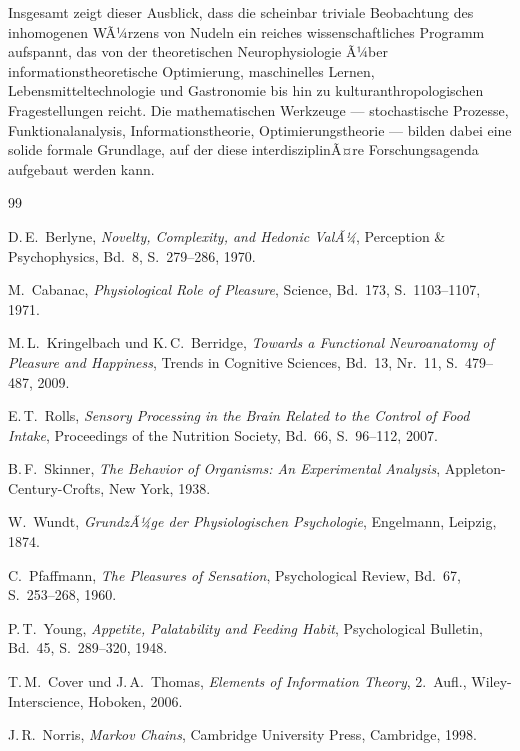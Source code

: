 ﻿\documentclass[12pt,a4paper]{article}
\theoremstyle{definition}
\begin{document}
\bigskip

Insgesamt zeigt dieser Ausblick, dass die scheinbar triviale
Beobachtung des inhomogenen WÃ¼rzens von Nudeln ein reiches
wissenschaftliches Programm aufspannt, das von der theoretischen
Neurophysiologie Ã¼ber informationstheoretische Optimierung, maschinelles
Lernen, Lebensmitteltechnologie und Gastronomie bis hin zu
kulturanthropologischen Fragestellungen reicht. Die mathematischen
Werkzeuge --- stochastische Prozesse, Funktionalanalysis,
Informationstheorie, Optimierungstheorie --- bilden dabei eine
solide formale Grundlage, auf der diese interdisziplinÃ¤re
Forschungsagenda aufgebaut werden kann.

\begin{thebibliography}{99}

D.\,E.\ Berlyne,
\textit{Novelty, Complexity, and Hedonic ValÃ¼},
Perception \& Psychophysics, Bd.\ 8, S.\ 279--286, 1970.

M.\ Cabanac,
\textit{Physiological Role of Pleasure},
Science, Bd.\ 173, S.\ 1103--1107, 1971.

M.\,L.\ Kringelbach und K.\,C.\ Berridge,
\textit{Towards a Functional Neuroanatomy of Pleasure and Happiness},
Trends in Cognitive Sciences, Bd.\ 13, Nr.\ 11, S.\ 479--487, 2009.

E.\,T.\ Rolls,
\textit{Sensory Processing in the Brain Related to the Control of Food Intake},
Proceedings of the Nutrition Society, Bd.\ 66, S.\ 96--112, 2007.

B.\,F.\ Skinner,
\textit{The Behavior of Organisms: An Experimental Analysis},
Appleton-Century-Crofts, New York, 1938.

W.\ Wundt,
\textit{GrundzÃ¼ge der Physiologischen Psychologie},
Engelmann, Leipzig, 1874.

C.\ Pfaffmann,
\textit{The Pleasures of Sensation},
Psychological Review, Bd.\ 67, S.\ 253--268, 1960.

P.\,T.\ Young,
\textit{Appetite, Palatability and Feeding Habit},
Psychological Bulletin, Bd.\ 45, S.\ 289--320, 1948.

T.\,M.\ Cover und J.\,A.\ Thomas,
\textit{Elements of Information Theory}, 2.\ Aufl.,
Wiley-Interscience, Hoboken, 2006.

J.\,R.\ Norris,
\textit{Markov Chains},
Cambridge University Press, Cambridge, 1998.

\end{thebibliography}
\end{document}
